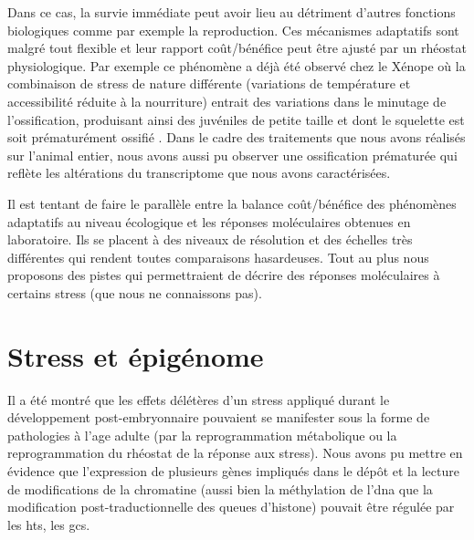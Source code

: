 \documentclass[../main.tex]{subfiles}
\begin{document}
Dans ce cas, la survie immédiate peut avoir lieu au détriment d'autres fonctions biologiques comme par exemple la reproduction. Ces mécanismes adaptatifs sont malgré tout flexible et leur rapport coût/bénéfice peut être ajusté par un rhéostat physiologique.
Par exemple ce phénomène a déjà été observé chez le Xénope où la combinaison de stress de nature différente (variations de température et accessibilité réduite à la nourriture) entrait des variations dans le minutage de l’ossification, produisant ainsi des juvéniles de petite taille et dont le squelette est soit prématurément ossifié \citep{Gomez-Mestre2010}.
Dans le cadre des traitements que nous avons réalisés sur l'animal entier, nous avons aussi pu observer une ossification prématurée qui reflète les altérations du transcriptome que nous avons caractérisées.
\par
Il est tentant de faire le parallèle entre la balance coût/bénéfice des phénomènes adaptatifs au niveau écologique et les réponses moléculaires obtenues en laboratoire.
Ils se placent à des niveaux de résolution et des échelles très différentes qui rendent toutes comparaisons hasardeuses.
Tout au plus nous proposons des pistes qui permettraient de décrire des réponses moléculaires à certains stress (que nous ne connaissons pas).


\section{Stress et épigénome}

Il a été montré que les effets délétères d'un stress appliqué durant le développement post-embryonnaire pouvaient se manifester sous la forme de pathologies à l'age adulte (par la reprogrammation métabolique ou la reprogrammation du rhéostat de la réponse aux stress).
Nous avons pu mettre en évidence que l'expression de plusieurs gènes impliqués dans le dépôt et la lecture de modifications de la chromatine (aussi bien la méthylation de l'\gls{dna} que la modification post-traductionnelle des queues d'histone) pouvait être régulée par les \glspl{ht}, les \glspl{gc}.
\end{document}
